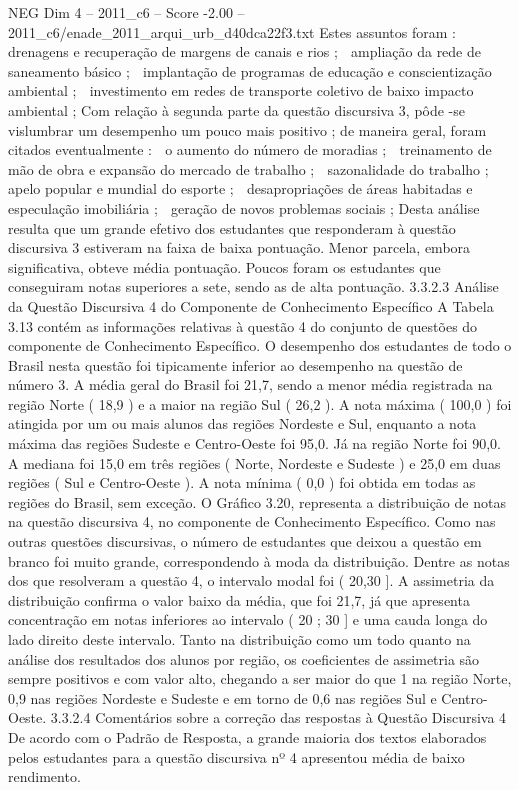 \begin{textsample}{NEG Dim 4 – 2011\_c6 – Score -2.00 – 2011\_c6/enade\_2011\_arqui\_urb\_d40dca22f3.txt}
Estes assuntos foram :  drenagens e recuperação de margens de canais e rios ;  ampliação da rede de saneamento básico ;  implantação de programas de educação e conscientização ambiental ;  investimento em redes de transporte coletivo de baixo impacto ambiental ; Com relação à segunda parte da questão discursiva 3, pôde -se vislumbrar um desempenho um pouco mais positivo ; de maneira geral, foram citados eventualmente :  o aumento do número de moradias ;  treinamento de mão de obra e expansão do mercado de trabalho ;  sazonalidade do trabalho ;  apelo popular e mundial do esporte ;  desapropriações de áreas habitadas e especulação imobiliária ;  geração de novos problemas sociais ; Desta análise resulta que um grande efetivo dos estudantes que responderam à questão discursiva 3 estiveram na faixa de baixa pontuação.
Menor parcela, embora significativa, obteve média pontuação.
Poucos foram os estudantes que conseguiram notas superiores a sete, sendo as de alta pontuação. 3.3.2.3 Análise da Questão Discursiva 4 do Componente de Conhecimento Específico A Tabela 3.13 contém as informações relativas à questão 4 do conjunto de questões do componente de Conhecimento Específico.
O desempenho dos estudantes de todo o Brasil nesta questão foi tipicamente inferior ao desempenho na questão de número 3.
A média geral do Brasil foi 21,7, sendo a menor média registrada na região Norte ( 18,9 ) e a maior na região Sul ( 26,2 ).
A nota máxima ( 100,0 ) foi atingida por um ou mais alunos das regiões Nordeste e Sul, enquanto a nota máxima das regiões Sudeste e Centro-Oeste foi 95,0.
Já na região Norte foi 90,0.
A mediana foi 15,0 em três regiões ( Norte, Nordeste e Sudeste ) e 25,0 em duas regiões ( Sul e Centro-Oeste ).
A nota mínima ( 0,0 ) foi obtida em todas as regiões do Brasil, sem exceção.
O Gráfico 3.20, representa a distribuição de notas na questão discursiva 4, no componente de Conhecimento Específico.
Como nas outras questões discursivas, o número de estudantes que deixou a questão em branco foi muito grande, correspondendo à moda da distribuição.
Dentre as notas dos que resolveram a questão 4, o intervalo modal foi ( 20,30 ].
A assimetria da distribuição confirma o valor baixo da média, que foi 21,7, já que apresenta concentração em notas inferiores ao intervalo ( 20 ; 30 ] e uma cauda longa do lado direito deste intervalo.
Tanto na distribuição como um todo quanto na análise dos resultados dos alunos por região, os coeficientes de assimetria são sempre positivos e com valor alto, chegando a ser maior do que 1 na região Norte, 0,9 nas regiões Nordeste e Sudeste e em torno de 0,6 nas regiões Sul e Centro-Oeste. 3.3.2.4 Comentários sobre a correção das respostas à Questão Discursiva 4 De acordo com o Padrão de Resposta, a grande maioria dos textos elaborados pelos estudantes para a questão discursiva nº 4 apresentou média de baixo rendimento.

\end{textsample}
